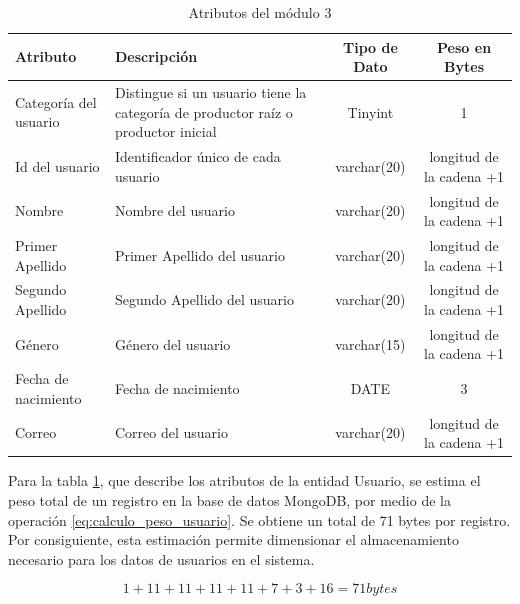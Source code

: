 \begin{table}[htbp]
    \centering
    \caption{Atributos del módulo 3} %
    \label{tab:Dato2}
    \footnotesize %

    \begin{tabular}{|>{\raggedright\arraybackslash}p{2.4cm}|>{\raggedright\arraybackslash}p{5.4cm}|c|c|}
        \hline
        \textbf{Atributo} & \textbf{Descripción} & \textbf{Tipo de Dato} & \textbf{Peso en Bytes} \\ \hline
        Categoría del usuario & Distingue si un usuario tiene la categoría de productor raíz o productor inicial & Tinyint & 1 \\ \hline
        Id del usuario & Identificador único de cada usuario & varchar(20) & longitud de la cadena +1 \\ \hline
        Nombre & Nombre del usuario & varchar(20) & longitud de la cadena +1 \\ \hline %
        Primer Apellido & Primer Apellido del usuario & varchar(20) & longitud de la cadena +1 \\ \hline
        Segundo Apellido & Segundo Apellido del usuario & varchar(20) & longitud de la cadena +1 \\ \hline
        Género & Género del usuario & varchar(15) & longitud de la cadena +1 \\ \hline
        Fecha de nacimiento & Fecha de nacimiento & DATE & 3 \\ \hline
        Correo & Correo del usuario & varchar(20) & longitud de la cadena +1 \\ \hline
    \end{tabular}
\end{table}

Para la tabla \ref{tab:Dato2}, que describe los atributos de la entidad Usuario, 
se estima el peso total de un registro en la base de datos MongoDB,
por medio de la operación \ref{eq:calculo_peso_usuario}. 
Se obtiene un total de 71 bytes por registro.
Por consiguiente, esta estimación permite dimensionar el almacenamiento necesario para los
datos de usuarios en el sistema.

\begin{equation}
1 + 11 + 11 + 11 + 11 + 7 + 3 + 16 = 71 bytes
\label{eq:calculo_peso_usuario}
\end{equation}

